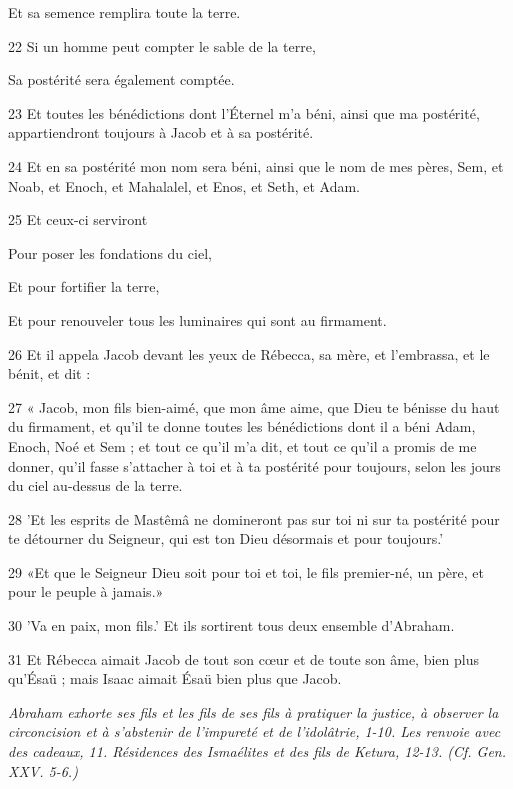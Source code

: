 \par     Et sa semence remplira toute la terre.
\par    
\par 22 Si un homme peut compter le sable de la terre,  
\par     Sa postérité sera également comptée.
\par    
\par 23 Et toutes les bénédictions dont l'Éternel m'a béni, ainsi que ma postérité, appartiendront toujours à Jacob et à sa postérité.
\par 24 Et en sa postérité mon nom sera béni, ainsi que le nom de mes pères, Sem, et Noab, et Enoch, et Mahalalel, et Enos, et Seth, et Adam.
\par 25 Et ceux-ci serviront
\par    
\par     Pour poser les fondations du ciel,  
\par     Et pour fortifier la terre,  
\par     Et pour renouveler tous les luminaires qui sont au firmament.
\par    
\par 26 Et il appela Jacob devant les yeux de Rébecca, sa mère, et l'embrassa, et le bénit, et dit :
\par 27 « Jacob, mon fils bien-aimé, que mon âme aime, que Dieu te bénisse du haut du firmament, et qu'il te donne toutes les bénédictions dont il a béni Adam, Enoch, Noé et Sem ; et tout ce qu'il m'a dit, et tout ce qu'il a promis de me donner, qu'il fasse s'attacher à toi et à ta postérité pour toujours, selon les jours du ciel au-dessus de la terre.
\par 28 'Et les esprits de Mastêmâ ne domineront pas sur toi ni sur ta postérité pour te détourner du Seigneur, qui est ton Dieu désormais et pour toujours.'
\par 29 «Et que le Seigneur Dieu soit pour toi et toi, le fils premier-né, un père, et pour le peuple à jamais.»
\par 30 'Va en paix, mon fils.' Et ils sortirent tous deux ensemble d’Abraham.
\par 31 Et Rébecca aimait Jacob de tout son cœur et de toute son âme, bien plus qu'Ésaü ; mais Isaac aimait Ésaü bien plus que Jacob.


\par \textit{Abraham exhorte ses fils et les fils de ses fils à pratiquer la justice, à observer la circoncision et à s'abstenir de l'impureté et de l'idolâtrie, 1-10. Les renvoie avec des cadeaux, 11. Résidences des Ismaélites et des fils de Ketura, 12-13. (Cf. Gen. XXV. 5-6.)}


